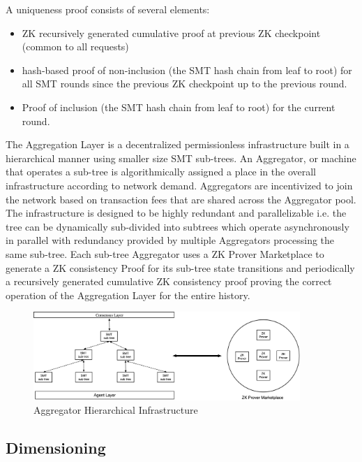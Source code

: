 \documentclass{article}
\begin{document}
 
 
  A uniqueness proof consists of several elements:

\begin{itemize}
    \item ZK recursively generated cumulative proof at previous ZK checkpoint (common to all requests)
    \item hash-based proof of non-inclusion (the SMT hash chain from leaf to root) for all SMT rounds since the previous ZK checkpoint up to the previous round.
    \item Proof of inclusion (the SMT hash chain from leaf to root) for the current round.
\end{itemize}



The Aggregation Layer is a decentralized permissionless infrastructure built in a hierarchical manner using smaller size SMT sub-trees. An Aggregator, or machine that operates a sub-tree is algorithmically assigned a place in the overall infrastructure according to network demand. Aggregators are incentivized to join the network based on transaction fees that are shared across the Aggregator pool. The infrastructure is designed to be highly redundant and parallelizable i.e. the tree can be dynamically sub-divided into subtrees which operate asynchronously in parallel with redundancy provided by multiple Aggregators processing the same sub-tree. Each sub-tree Aggregator uses a ZK Prover Marketplace to generate a ZK consistency Proof for its sub-tree state transitions and periodically a recursively generated cumulative ZK consistency proof proving the correct operation of the Aggregation Layer for the entire history. 


\begin{figure}[htbp]
    \centering
    \includegraphics[width=0.9\textwidth]{SMT-ProverMarketPlace.png}
    \caption{Aggregator Hierarchical Infrastructure}
    \label{fig:SMT-Infra}
\end{figure}



\subsection{Dimensioning}
\end{document}
